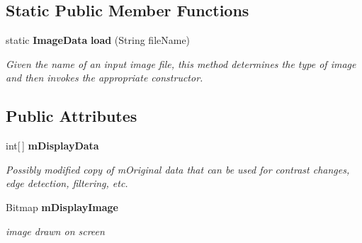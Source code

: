 \subsection*{Static Public Member Functions}
\begin{CompactItemize}
\item 
static {\bf Image\-Data} {\bf load} (String file\-Name)
\begin{CompactList}\small\item\em Given the name of an input image file, this method determines the type of image and then invokes the appropriate constructor. \item\end{CompactList}\end{CompactItemize}
\subsection*{Public Attributes}
\begin{CompactItemize}
\item 
int[$\,$] {\bf m\-Display\-Data}
\begin{CompactList}\small\item\em Possibly modified copy of m\-Original data that can be used for contrast changes, edge detection, filtering, etc. \item\end{CompactList}\item 
Bitmap {\bf m\-Display\-Image}
\begin{CompactList}\small\item\em image drawn on screen \item\end{CompactList}\end{CompactItemize}
